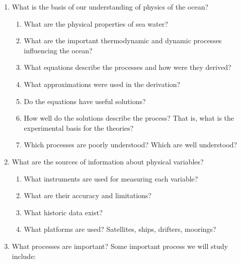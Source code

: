 \begin{enumerate}
\item What is the basis of our understanding of physics of the ocean?
\vspace{-0.5ex}
\begin{enumerate}
\item   What are the physical properties of sea water?
\vspace{-0.5ex}
\item   What are the important thermodynamic and dynamic processes influencing the
ocean?
\vspace{-0.5ex}
\item   What equations describe the processes and how were they derived?
\vspace{-0.5ex}
\item   What approximations were used in the derivation?
\vspace{-0.5ex}
\item   Do the equations have useful solutions?
\vspace{-0.5ex}
\item   How well do the solutions describe the process? That is, what is the
experimental basis for the theories?
\vspace{-0.5ex}
\item   Which processes are poorly understood? Which are well understood?
\end{enumerate}
\item  What are the sources of information about physical variables?
\vspace{-0.5ex}
\begin{enumerate}
\vspace{-0.5ex}
\item   What instruments are used for measuring each variable?
\vspace{-0.5ex}
\item   What are their accuracy and limitations?
\vspace{-0.5ex}
\item What historic data exist?
\vspace{-0.5ex}
\item   What platforms are used? Satellites, ships, drifters, moorings?
\end{enumerate}
\vspace{-0.5ex}
\item What processes are important? Some important process we will study include:
\begin{enumerate}
\vspace{-0.5ex}

\end{enumerate}
\end{enumerate}
